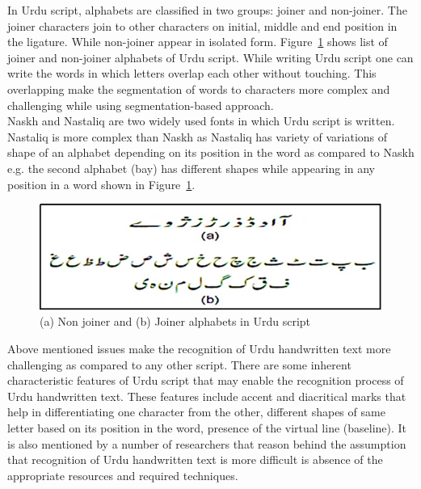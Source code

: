 \documentclass[a4paper,conference]{IEEEtran}
\newcommand*{\img}[1]{%
    \raisebox{-.02\baselineskip}{%
        \texttt{[image: \#1]}%
    }%
}
\begin{document}
In Urdu script, alphabets are classified in two groups: joiner and non-joiner. The joiner characters join to other characters on initial, middle and end position in the ligature. While non-joiner appear in isolated form. Figure~\ref{fig2} shows list of joiner and non-joiner alphabets of Urdu script. While writing Urdu script one can write the words in which letters overlap each other without touching. This overlapping make the segmentation of words to characters more complex and challenging while using segmentation-based approach.\\
Naskh and Nastaliq are two widely used fonts in which Urdu script is written. Nastaliq is more complex than Naskh as Nastaliq \cite{4} has variety of variations of shape of an alphabet depending on its position in the word as compared to Naskh e.g. the second alphabet \img{Bay.png}(bay) has different shapes while appearing in any position in a word shown in Figure~\ref{fig2}.\\ 
\begin{figure}[t]
\centering
	\includegraphics[width=8.cm]{joiner.png}
\caption{(a) Non joiner and (b) Joiner alphabets in Urdu script}\label{fig2}
\end{figure}
Above mentioned issues make the recognition of Urdu handwritten text more challenging as compared to any other script. There are some inherent characteristic features of Urdu script that may enable the recognition process of Urdu handwritten text. These features include accent and diacritical marks that help in differentiating  one character from the other, different shapes of same letter based on its position in the word, presence of the virtual line (baseline). 
It is also mentioned by a number of researchers that reason behind the assumption that recognition of Urdu handwritten text is more difficult is absence of the appropriate resources and required techniques.\\
\end{document}

